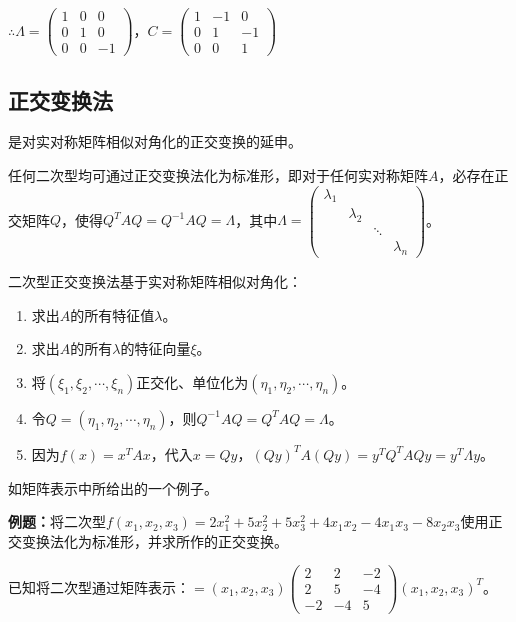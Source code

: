 \documentclass[UTF8, 12pt]{ctexart}
\begin{document}
$\therefore\Lambda=\left(\begin{array}{ccc}
    1 & 0 & 0 \\
    0 & 1 & 0 \\
    0 & 0 & -1
\end{array}\right)$，$C=\left(\begin{array}{ccc}
    1 & -1 & 0 \\
    0 & 1 & -1 \\
    0 & 0 & 1
\end{array}\right)$

\subsection{正交变换法}

是对实对称矩阵相似对角化的正交变换的延申。

任何二次型均可通过正交变换法化为标准形，即对于任何实对称矩阵$A$，必存在正交矩阵$Q$，使得$Q^TAQ=Q^{-1}AQ=\Lambda$，其中$\Lambda=\left(\begin{array}{cccc}
    \lambda_1 \\
     & \lambda_2 \\
     & & \ddots \\
     & & & \lambda_n
\end{array}\right)$。

二次型正交变换法基于实对称矩阵相似对角化：

\begin{enumerate}
    \item 求出$A$的所有特征值$\lambda$。
    \item 求出$A$的所有$\lambda$的特征向量$\xi$。
    \item 将$(\xi_1,\xi_2,\cdots,\xi_n)$正交化、单位化为$(\eta_1,\eta_2,\cdots,\eta_n)$。
    \item 令$Q=(\eta_1,\eta_2,\cdots,\eta_n)$，则$Q^{-1}AQ=Q^TAQ=\Lambda$。
    \item 因为$f(x)=x^TAx$，代入$x=Qy$，$(Qy)^TA(Qy)=y^TQ^TAQy=y^T\Lambda y$。
\end{enumerate}

如矩阵表示中所给出的一个例子。

\textbf{例题：}将二次型$f(x_1,x_2,x_3)=2x_1^2+5x_2^2+5x_3^2+4x_1x_2-4x_1x_3-8x_2x_3$使用正交变换法化为标准形，并求所作的正交变换。

已知将二次型通过矩阵表示：$=(x_1,x_2,x_3)\left(\begin{array}{ccc}
    2 & 2 & -2 \\
    2 & 5 & -4 \\
    -2 & -4 & 5
\end{array}\right)(x_1,x_2,x_3)^T$。\medskip
\end{document}
